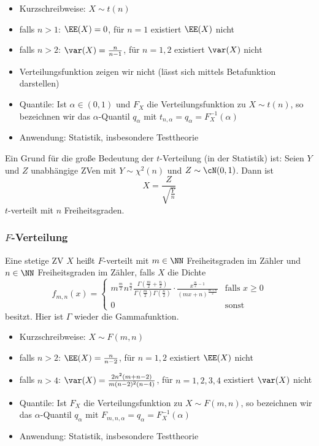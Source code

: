\begin{itemize}
	\item Kurzschreibweise: $X\sim t(n)$
	\item falls $n>1$: $\EE(X)=0$, für $n=1$ existiert $\EE(X)$ nicht
	\item falls $n>2$: $\var(X)=\frac{n}{n-1}$, für $n=1,2$ existiert $\var(X)$ nicht
	\item Verteilungsfunktion zeigen wir nicht (lässt sich mittels Betafunktion darstellen)
	\item Quantile: Ist $\alpha \in (0,1)$ und $F_X$ die Verteilungsfunktion zu $X\sim t(n)$, so bezeichnen wir das $\alpha$-Quantil $q_\alpha$ mit $t_{n,\alpha}=q_\alpha=F_{X}^{-1}(\alpha)$
	\item Anwendung: Statistik, insbesondere Testtheorie
\end{itemize}

Ein Grund für die große Bedeutung der $ t $-Verteilung (in der Statistik) ist:
 Seien $ Y $ und $ Z $ unabhängige ZVen mit $ Y\sim \chi^{2} (n) $ und $ Z \sim \cN(0,1) $. Dann ist 
\[ X=\frac{Z}{\sqrt{\frac{Y}{n}}} \]
$ t $-verteilt mit $ n $ Freiheitsgraden.

\subsubsection{$ F $-Verteilung}

 Eine stetige ZV $X$ heißt $F$-verteilt mit $m\in \NN$ Freiheitsgraden im Zähler und $n\in \NN$ Freiheitsgraden im Zähler, falls $X$ die Dichte
\[ f_{m,n}(x)=\begin{cases}
m^{\frac{m}{2}}n^{\frac{n}{2}}\frac{\Gamma\left(\frac{m}{2}+\frac{n}{2}\right)}{\Gamma\left(\frac{m}{2}\right)\Gamma\left(\frac{n}{2}\right)}\cdot \frac{x^{\frac{m}{2}-1}}{(mx+n)^{\frac{m+n}{2}}} & \text{falls }x\geq 0\\
0 & \text{sonst}
\end{cases} \] 
besitzt. Hier ist $\Gamma$ wieder die Gammafunktion.
\begin{itemize}
	\item Kurzschreibweise: $X\sim F(m,n)$
	\item falls $n>2$: $\EE(X)=\frac{n}{n-2}$, für $n=1,2$ existiert $\EE(X)$ nicht
	\item falls $n>4$: $\var(X)=\frac{2n^2(m+n-2)}{m(n-2)^2(n-4)}$, für $n=1,2,3,4$ existiert $\var(X)$ nicht
	\item Quantile: Ist $F_X$ die Verteilungsfunktion zu $X\sim F(m,n)$, so bezeichnen wir das $\alpha$-Quantil $q_\alpha$ mit $F_{m,n,\alpha}=q_\alpha=F_{X}^{-1}(\alpha)$
	\item Anwendung: Statistik, insbesondere Testtheorie
\end{itemize}

